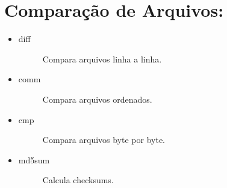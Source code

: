 \documentclass[a4paper,10pt,brazil]{sphinxmanual}
\begin{document}
\section{Comparação de Arquivos:}
\label{unix:comparacao-de-arquivos}\begin{itemize}
\item {} \begin{description}
\item[{diff}] \leavevmode
Compara arquivos linha a linha.

\end{description}

\item {} \begin{description}
\item[{comm}] \leavevmode
Compara arquivos ordenados.

\end{description}

\item {} \begin{description}
\item[{cmp}] \leavevmode
Compara arquivos byte por byte.

\end{description}

\item {} \begin{description}
\item[{md5sum}] \leavevmode
Calcula checksums.

\end{description}

\end{itemize}
\end{document}
